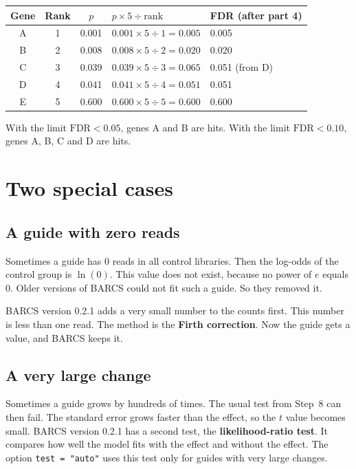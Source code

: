 \documentclass[12pt]{article}
\begin{document}
\begin{worked}
\begin{tabular}{@{}cccll@{}}
\toprule
Gene & Rank & $p$ & $p \times 5 \div \text{rank}$ & FDR (after part 4)\\
\midrule
A & 1 & 0.001 & $0.001 \times 5 \div 1 = 0.005$ & 0.005\\
B & 2 & 0.008 & $0.008 \times 5 \div 2 = 0.020$ & 0.020\\
C & 3 & 0.039 & $0.039 \times 5 \div 3 = 0.065$ & 0.051 (from D)\\
D & 4 & 0.041 & $0.041 \times 5 \div 4 = 0.051$ & 0.051\\
E & 5 & 0.600 & $0.600 \times 5 \div 5 = 0.600$ & 0.600\\
\bottomrule
\end{tabular}

\smallskip
With the limit $\text{FDR} < 0.05$, genes A and B are hits. With the limit
$\text{FDR} < 0.10$, genes A, B, C and D are hits.
\end{worked}

\section{Two special cases}

\subsection{A guide with zero reads}

Sometimes a guide has 0 reads in all control libraries. Then the log-odds
of the control group is $\ln(0)$. This value does not exist, because no
power of $e$ equals 0. Older versions of BARCS could not fit such a guide.
So they removed it.

BARCS version 0.2.1 adds a very small number to the counts first. This
number is less than one read. The method is the \textbf{Firth correction}.
Now the guide gets a value, and BARCS keeps it.

\subsection{A very large change}

Sometimes a guide grows by hundreds of times. The usual test from Step~8
can then fail. The standard error grows faster than the effect, so the
$t$ value becomes small. BARCS version 0.2.1 has a second test, the
\textbf{likelihood-ratio test}. It compares how well the model fits with
the effect and without the effect. The option \texttt{test = "auto"} uses
this test only for guides with very large changes.
\end{document}
